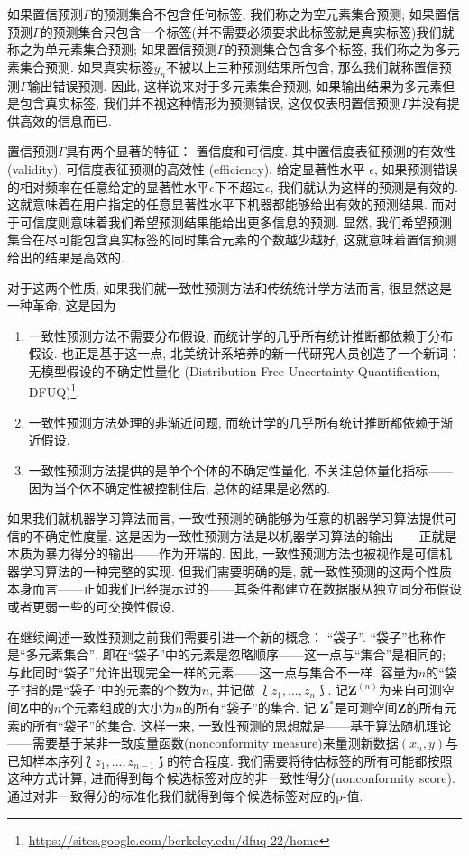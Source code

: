 如果置信预测$\Gamma$的预测集合不包含任何标签, 我们称之为空元素集合预测; 如果置信预测$\Gamma$的预测集合只包含一个标签(并不需要必须要求此标签就是真实标签)我们就称之为单元素集合预测; 如果置信预测$\Gamma$的预测集合包含多个标签, 我们称之为多元素集合预测. 如果真实标签$y_{n}$不被以上三种预测结果所包含, 那么我们就称置信预测$\Gamma$输出错误预测. 因此, 这样说来对于多元素集合预测, 如果输出结果为多元素但是包含真实标签, 我们并不视这种情形为预测错误, 这仅仅表明置信预测$\Gamma$并没有提供高效的信息而已. 

置信预测$\Gamma$具有两个显著的特征： \textsf{置信度}和\textsf{可信度}. 其中置信度表征预测的\textsf{有效性} (validity), 可信度表征预测的\textsf{高效性} (efficiency). 给定显著性水平 $\epsilon$, 如果预测错误的相对频率在任意给定的显著性水平$\epsilon$下不超过$\epsilon$, 我们就认为这样的预测是有效的. 这就意味着在用户指定的任意显著性水平下机器都能够给出有效的预测结果. 而对于可信度则意味着我们希望预测结果能给出更多信息的预测. 显然, 我们希望预测集合在尽可能包含真实标签的同时集合元素的个数越少越好, 这就意味着置信预测给出的结果是高效的. 

对于这两个性质, 如果我们就一致性预测方法和传统统计学方法而言, 很显然这是一种革命, 这是因为
\begin{enumerate}
\item 一致性预测方法不需要分布假设, 而统计学的几乎所有统计推断都依赖于分布假设. 也正是基于这一点, 北美统计系培养的新一代研究人员创造了一个新词： 无模型假设的不确定性量化 (Distribution-Free Uncertainty Quantification, DFUQ)\footnote{\url{https://sites.google.com/berkeley.edu/dfuq-22/home}}.
\item 一致性预测方法处理的非渐近问题, 而统计学的几乎所有统计推断都依赖于渐近假设.
\item 一致性预测方法提供的是单个个体的不确定性量化, 不关注总体量化指标——因为当个体不确定性被控制住后, 总体的结果是必然的.
\end{enumerate}

如果我们就机器学习算法而言, 一致性预测的确能够为任意的机器学习算法提供可信的不确定性度量. 这是因为一致性预测方法是以机器学习算法的输出——正就是本质为暴力得分的输出——作为开端的. 因此, 一致性预测方法也被视作是可信机器学习算法的一种完整的实现. 但我们需要明确的是, 就一致性预测的这两个性质本身而言——正如我们已经提示过的——其条件都建立在数据服从独立同分布假设或者更弱一些的可交换性假设.

在继续阐述一致性预测之前我们需要引进一个新的概念： “袋子”. “袋子”也称作是“多元素集合”, 即在“袋子”中的元素是忽略顺序——这一点与“集合”是相同的; 与此同时“袋子”允许出现完全一样的元素——这一点与集合不一样. 容量为$n$的“袋子”指的是“袋子”中的元素的个数为$n$, 并记做 $\Lbag z_1, \ldots, z_{n} \Rbag$. 记$\mathbf{Z}^{(n)}$为来自可测空间$\mathbf{Z}$中的$n$个元素组成的大小为$n$的所有“袋子”的集合. 记 $\mathbf{Z}^{*}$是可测空间$\mathbf{Z}$的所有元素的所有“袋子”的集合. 这样一来, 一致性预测的思想就是——基于算法随机理论——需要基于某非一致度量函数(nonconformity measure)来量测新数据$(x_{n}, y)$与已知样本序列$\Lbag z_1, \ldots, z_{n-1} \Rbag$的符合程度. 我们需要将待估标签的所有可能都按照这种方式计算, 进而得到每个候选标签对应的非一致性得分(nonconformity score). 通过对非一致得分的标准化我们就得到每个候选标签对应的p-值.


